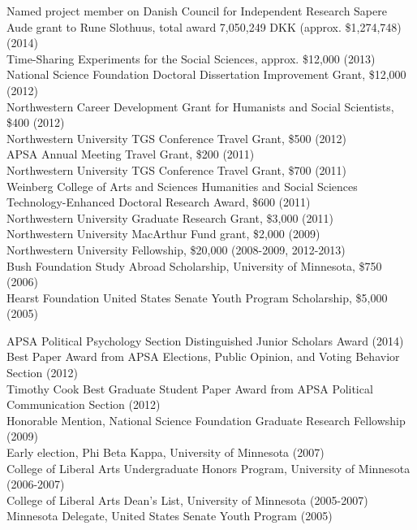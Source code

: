 \documentclass[12pt]{article}
\renewcommand{\section}[1]{\pagebreak[3]%
    \llap{\scshape\smash{\parbox[t]{\marginparwidth}{\raggedright {\color{lg}#1}}}}%
    \vspace{-\baselineskip}\par}
\newcommand{\entry}[1]{\indent {\color{lg}\guillemotright}\hspace{2pt}#1\vspace{.25em}\\}
\begin{document}
\section{Grants\\and\\Funding}
\entry{Named project member on Danish Council for Independent Research Sapere Aude grant to Rune Slothuus, total award 7,050,249 DKK (approx. \$1,274,748) (2014)}
\entry{Time-Sharing Experiments for the Social Sciences, approx. \$12,000 (2013)}
\entry{National Science Foundation Doctoral Dissertation Improvement Grant, \$12,000 (2012)}
\entry{Northwestern Career Development Grant for Humanists and Social Scientists, \$400 (2012)}
\entry{Northwestern University TGS Conference Travel Grant, \$500 (2012)}
\entry{APSA Annual Meeting Travel Grant, \$200 (2011)}
\entry{Northwestern University TGS Conference Travel Grant, \$700 (2011)}
\entry{Weinberg College of Arts and Sciences Humanities and Social Sciences Technology-Enhanced Doctoral Research Award, \$600 (2011)}
\entry{Northwestern University Graduate Research Grant, \$3,000 (2011)}
\entry{Northwestern University MacArthur Fund grant, \$2,000 (2009)}
\entry{Northwestern University Fellowship, \$20,000 (2008-2009, 2012-2013)}
\entry{Bush Foundation Study Abroad Scholarship, University of Minnesota, \$750 (2006)}
\entry{Hearst Foundation United States Senate Youth Program Scholarship, \$5,000 (2005)}

\section{Honors\\and\\Awards}
\entry{APSA Political Psychology Section Distinguished Junior Scholars Award (2014)}
\entry{Best Paper Award from APSA Elections, Public Opinion, and Voting Behavior Section (2012)}
\entry{Timothy Cook Best Graduate Student Paper Award from APSA Political Communication Section (2012)}
\entry{Honorable Mention, National Science Foundation Graduate Research Fellowship (2009)}
\entry{Early election, Phi Beta Kappa, University of Minnesota (2007)}
\entry{College of Liberal Arts Undergraduate Honors Program, University of Minnesota (2006-2007)}
\entry{College of Liberal Arts Dean's List, University of Minnesota (2005-2007)}
\entry{Minnesota Delegate, United States Senate Youth Program (2005)}
\end{document}
